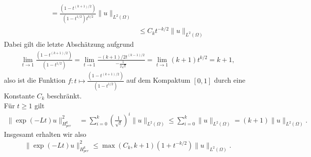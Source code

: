 \begin{solution}
\begin{enumerate}[label = (\roman*)]
\begin{align*}
    = \frac{(1- t^{(k+1)/2})}{(1-t^{1/2})t^{k/2}}\|u\|_{L^2(\Omega)} \\
    &\leq C_kt^{-k/2}\|u\|_{L^2(\Omega)}
  \end{align*}
  Dabei gilt die letzte Abschätzung aufgrund
  \begin{align*}
    \lim_{t \to 1 } \frac{(1- t^{(k+1)/2})}{(1-t^{1/2})} =
    \lim_{t \to 1 }\frac{-(k+1)/2t^{(k-1)/2}}{-\frac{1}{2\sqrt{t}}} = \lim_{t\to 1}(k+1)t^{k/2} =
    k + 1,
  \end{align*}
  also ist die Funktion $f: t \mapsto \frac{(1- t^{(k+1)/2})}{(1-t^{1/2})}$
  auf dem Kompaktum $[0,1]$ durch eine Konstante $C_k$ beschränkt. \\
  Für $t \geq 1$ gilt
  \begin{align*}
    \|\exp(-Lt)u\|_{H_{per}^k}^2 &= \sum_{i=0}^k \left(\frac{1}{\sqrt{t}}\right)^i \|u\|_{L^2(\Omega)}
    \leq \sum_{i=0}^k \|u\|_{L^2(\Omega)} = (k + 1)\|u\|_{L^2(\Omega)}.
  \end{align*}
  Insgesamt erhalten wir also
  \begin{align*}
    \|\exp(-Lt)u\|_{H_{per}^k}^2 \leq \max(C_k, k + 1)(1 + t^{-k/2})\|u\|_{L^2(\Omega)}.
  \end{align*}
\end{enumerate}

\end{solution}


